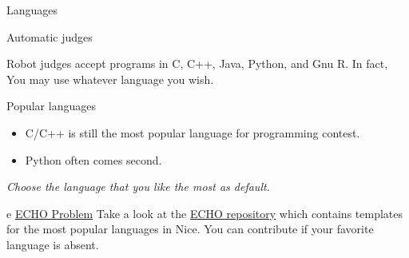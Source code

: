 \documentclass{beamer}
\begin{document}
\begin{frame}{Languages}

  \begin{block}{Automatic judges}
    \begin{itemize}
      Robot judges accept programs in C, C++, Java, Python, and Gnu R. In fact, You may use whatever language you wish. 
    \end{itemize}
  \end{block}

  \begin{block}{Popular languages}
    \begin{itemize}
    \item C/C++ is still the most popular language for programming contest.
    \item Python often comes second.
    \end{itemize}
    \emph{Choose the language that you like the most as default.}
  \end{block}

\begin{block}{e \href{https://github.com/arnaud-m/echo}{ECHO Problem}}
  Take a look at the \href{https://github.com/arnaud-m/echo}{ECHO repository} which contains templates for the most popular languages in Nice. You can contribute if your favorite language is absent.
\end{block}

  \end{frame}
\end{document}
